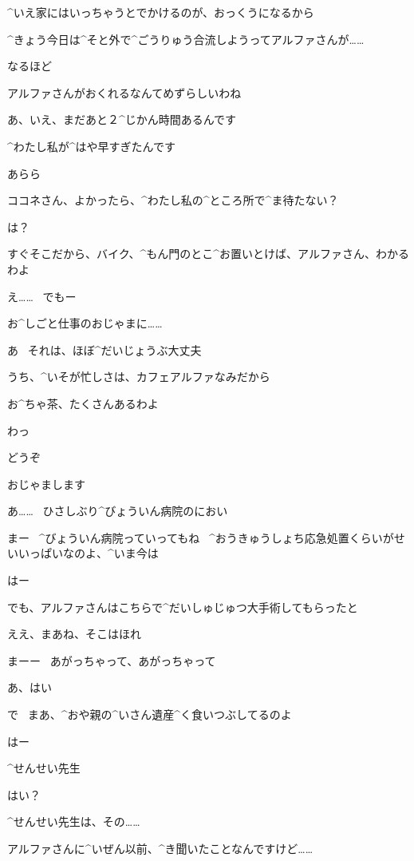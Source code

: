 \Kokone ^{いえ}{家}にはいっちゃうとでかけるのが、おっくうになるから

\Kokone ^{きょう}{今日}は^{そと}{外}で^{ごうりゅう}{合流}しようってアルファさんが……

\Sensei なるほど

\Sensei アルファさんがおくれるなんてめずらしいわね

\Kokone あ、いえ、まだあと２^{じかん}{時間}あるんです

\Kokone ^{わたし}{私}が^{はや}{早}すぎたんです

\Sensei あらら

\page[75]
\Sensei ココネさん、よかったら、^{わたし}{私}の^{ところ}{所}で^{ま}{待}たない？

\Kokone は？

\Sensei すぐそこだから、バイク、^{もん}{門}のとこ^{お}{置}いとけば、アルファさん、わかるわよ

\Kokone え……
\ でもー

\Kokone お^{しごと}{仕事}のおじゃまに……

\Sensei あ
\ それは、ほぼ^{だいじょうぶ}{大丈夫}

\page[76]
\Sensei うち、^{いそが}{忙}しさは、カフェアルファなみだから

\Sensei お^{ちゃ}{茶}、たくさんあるわよ

\Kokone わっ

\page[77]
\Sensei どうぞ

\Kokone おじゃまします

\Kokone あ……
\ ひさしぶり^{びょういん}{病院}のにおい

\Sensei まー
\ ^{びょういん}{病院}っていってもね
\ ^{おうきゅうしょち}{応急処置}くらいがせいいっぱいなのよ、^{いま}{今}は

\Kokone はー

\Kokone でも、アルファさんはこちらで^{だいしゅじゅつ}{大手術}してもらったと

\Sensei ええ、まあね、そこはほれ

\Sensei まーー
\ あがっちゃって、あがっちゃって

\Kokone あ、はい

\page[78]
\Sensei で
\ まあ、^{おや}{親}の^{いさん}{遺産}^{く}{食}いつぶしてるのよ

\Kokone はー

\Kokone ^{せんせい}{先生}

\Sensei はい？

\Kokone ^{せんせい}{先生}は、その……

\Kokone アルファさんに^{いぜん}{以前}、^{き}{聞}いたことなんですけど……

